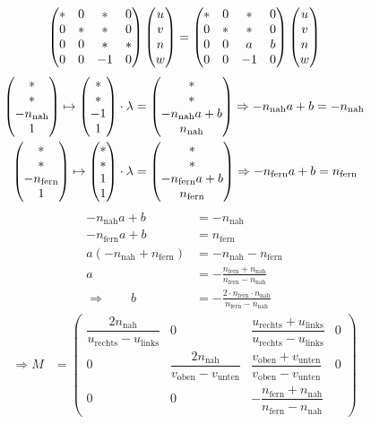 \begin{itemize}
\[\begin{pmatrix}
	                               * & 0 & * & 0\\
				       0 & * & * & 0\\
				       0 & 0 & * & *\\
				       0 & 0 & -1& 0
	                              \end{pmatrix}
		\begin{pmatrix}u\\v\\n\\w\end{pmatrix} = \begin{pmatrix}
	                               * & 0 & * & 0\\
				       0 & * & * & 0\\
				       0 & 0 & a & b\\
				       0 & 0 & -1& 0
	                              \end{pmatrix}\begin{pmatrix}u\\v\\n\\w\end{pmatrix}\]
	\begin{align*}
	\begin{pmatrix}*\\ *\\-n_{\mathrm{nah}}\\1\end{pmatrix} \mapsto \begin{pmatrix}*\\ *\\-1\\1\end{pmatrix} \cdot \lambda
		&= \begin{pmatrix}*\\ *\\-n_{\mathrm{nah}} a+ b\\n_{\mathrm{nah}}\end{pmatrix}
			\Rightarrow -n_{\mathrm{nah}} a + b = -n_{\mathrm{nah}}\\
	\begin{pmatrix}*\\ *\\-n_{\mathrm{fern}}\\1\end{pmatrix} \mapsto \begin{pmatrix}*\\ *\\1\\1\end{pmatrix} \cdot \lambda
		&= \begin{pmatrix}*\\ *\\-n_{\mathrm{fern}} a+ b\\n_{\mathrm{fern}}\end{pmatrix}
			\Rightarrow -n_{\mathrm{fern}} a + b = n_{\mathrm{fern}}
	\end{align*}
	\begin{align*}
	 -n_{\mathrm{nah}} a + b &= -n_{\mathrm{nah}} \\
	 -n_{\mathrm{fern}} a + b &= n_{\mathrm{fern}}\\
	 \hline
	 a(-n_{\mathrm{nah}}+n_{\mathrm{fern}}) &= -n_{\mathrm{nah}}-n_{\mathrm{fern}}\\
	 a &= -\frac{n_{\mathrm{fern}}+n_{\mathrm{nah}}}{n_{\mathrm{fern}}-n_{\mathrm{nah}}}\\
	 \Rightarrow \qquad b &= -\frac{2 \cdot n_{\mathrm{fern}}\cdot n_{\mathrm{nah}}}
		{n_{\mathrm{fern}}-n_{\mathrm{nah}}}
	\end{align*}
	\begin{align*}
	\Rightarrow M &= \begin{pmatrix}
	       \dfrac{2 n_{\mathrm{nah}}}{u_{\mathrm{rechts}} - u_{\mathrm{links}}} & 0 &
	       \dfrac{u_{\mathrm{rechts}}+ u_{\mathrm{links}}}{u_{\mathrm{rechts}}-u_{\mathrm{links}}} & 0\\
	       0 & \dfrac{2 n_{\mathrm{nah}}}{v_{\mathrm{oben}} - v_{\mathrm{unten}}} &
	       \dfrac{v_{\mathrm{oben}}+v_{\mathrm{unten}}}{v_{\mathrm{oben}}-v_{\mathrm{unten}}} & 0\\
	       0 & 0 & - \dfrac{n_{\mathrm{fern}}+n_{\mathrm{nah}}}{n_{\mathrm{fern}}-n_{\mathrm{nah}}} &

\end{pmatrix}
\end{align*}
\end{itemize}
